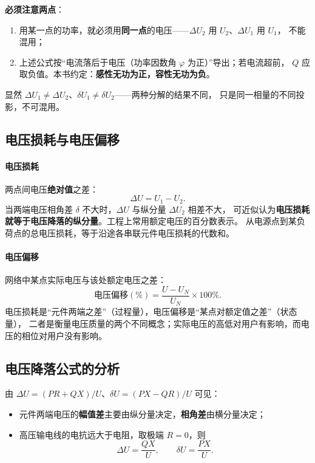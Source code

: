 \textbf{必须注意两点}：
\begin{enumerate}
  \item 用某一点的功率，就必须用\textbf{同一点}的电压——$\Delta U_2$ 用 $U_2$、$\Delta U_1$ 用 $U_1$，
        不能混用；
  \item 上述公式按“电流落后于电压（功率因数角 $\varphi$ 为正）”导出；若电流超前，
        $Q$ 应取负值。本书约定：\textbf{感性无功为正，容性无功为负}。
\end{enumerate}
显然 $\Delta U_1\ne\Delta U_2$、$\delta U_1\ne\delta U_2$——两种分解的结果不同，
只是同一相量的不同投影，不可混用。

\subsection{电压损耗与电压偏移}

\paragraph{电压损耗} 两点间电压\textbf{绝对值}之差：
\begin{equation}
  \Delta U=U_1-U_2 .
\end{equation}
当两端电压相角差 $\delta$ 不大时，$\Delta U$ 与纵分量 $\Delta U_2$ 相差不大，
可近似认为\textbf{电压损耗就等于电压降落的纵分量}。工程上常用额定电压的百分数表示。
从电源点到某负荷点的总电压损耗，等于沿途各串联元件电压损耗的代数和。

\paragraph{电压偏移} 网络中某点实际电压与该处额定电压之差：
\begin{equation}
  \text{电压偏移}(\%)=\frac{U-U_N}{U_N}\times 100\% .
\end{equation}
电压损耗是“元件两端之差”（过程量），电压偏移是“某点对额定值之差”（状态量），
二者是衡量电压质量的两个不同概念；实际电压的高低对用户有影响，而电压的相位对用户没有影响。

\subsection{电压降落公式的分析}

由 $\Delta U=(PR+QX)/U$、$\delta U=(PX-QR)/U$ 可见：
\begin{itemize}
  \item 元件两端电压的\textbf{幅值差}主要由纵分量决定，\textbf{相角差}由横分量决定；
  \item 高压输电线的电抗远大于电阻，取极端 $R=0$，则
        \begin{equation}
          \Delta U=\frac{QX}{U},\qquad \delta U=\frac{PX}{U}.
        \end{equation}
\end{itemize}

